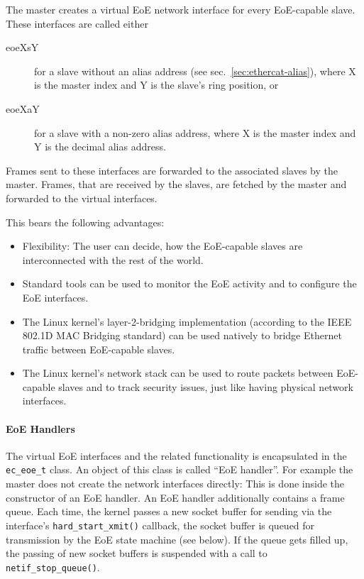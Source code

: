 \documentclass[a4paper,12pt,BCOR6mm,bibtotoc,idxtotoc]{scrbook}
\begin{document}
The master creates a virtual EoE network interface for every EoE-capable
slave. These interfaces are called either

\begin{description}

\item[eoeXsY] for a slave without an alias address (see
sec.~\ref{sec:ethercat-alias}), where X is the master index and Y is the
slave's ring position, or

\item[eoeXaY] for a slave with a non-zero alias address, where X is the master
index and Y is the decimal alias address.

\end{description}

Frames sent to these interfaces are forwarded to the associated slaves by the
master. Frames, that are received by the slaves, are fetched by the master and
forwarded to the virtual interfaces.

This bears the following advantages:

\begin{itemize}

\item Flexibility: The user can decide, how the EoE-capable slaves are
interconnected with the rest of the world.

\item Standard tools can be used to monitor the EoE activity and to configure
the EoE interfaces.

\item The Linux kernel's layer-2-bridging implementation (according to the
IEEE 802.1D MAC Bridging standard) can be used natively to bridge Ethernet
traffic between EoE-capable slaves.

\item The Linux kernel's network stack can be used to route packets between
EoE-capable slaves and to track security issues, just like having physical
network interfaces.

\end{itemize}

\paragraph{EoE Handlers}

The virtual EoE interfaces and the related functionality is encapsulated in
the \lstinline+ec_eoe_t+ class. An object of this class is called ``EoE
handler''. For example the master does not create the network interfaces
directly: This is done inside the constructor of an EoE handler. An EoE
handler additionally contains a frame queue. Each time, the kernel passes a
new socket buffer for sending via the interface's
\lstinline+hard_start_xmit()+ callback, the socket buffer is queued for
transmission by the EoE state machine (see below). If the queue gets filled
up, the passing of new socket buffers is suspended with a call to
\lstinline+netif_stop_queue()+.
\end{document}
